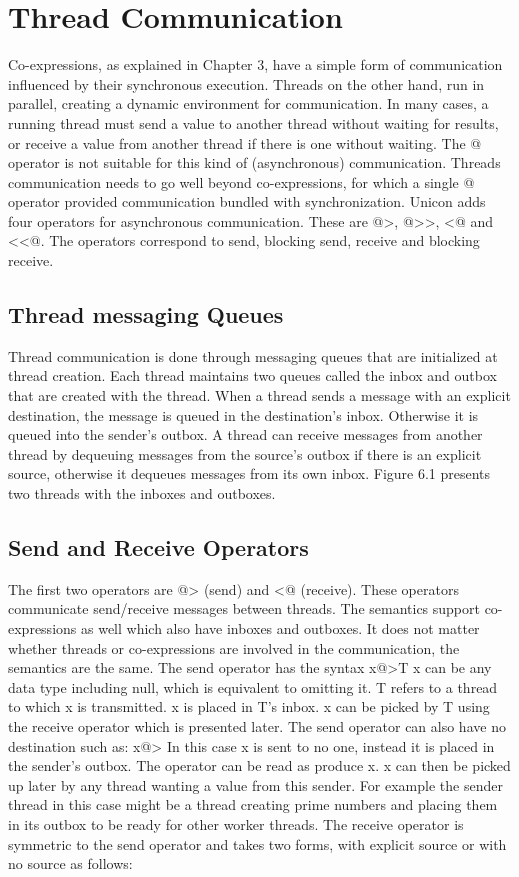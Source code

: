 \section{Thread Communication}
Co-expressions, as explained in Chapter 3, have a simple form of communication
influenced by their synchronous execution. Threads on the other hand, run in parallel,
creating a dynamic environment for communication. In many cases, a running thread
must send a value to another thread without waiting for results, or receive
a value from another thread if there is one without waiting. The @ operator is not
suitable for this kind of (asynchronous) communication. Threads communication needs
to go well beyond co-expressions, for which a single @ operator provided communication
bundled with synchronization. Unicon adds four operators for asynchronous
communication. These are @>, @>>, <@ and <<@. The operators correspond to send,
blocking send, receive and blocking receive.

\subsection{Thread messaging Queues}
Thread communication is done through messaging queues that are initialized at thread
creation. Each thread maintains two queues called the inbox and outbox that are created
with the thread. When a thread sends a message with an explicit destination, the message
is queued in the destination's inbox. Otherwise it is queued into the sender's outbox.
A thread can receive messages from another thread by dequeuing messages from the source's
outbox if there is an explicit source, otherwise it dequeues messages from its own inbox.
Figure 6.1 presents two threads with the inboxes and outboxes. 


\subsection{Send and Receive Operators}
The first two operators are @> (send) and <@ (receive). These operators communicate
send/receive messages between threads. The semantics support co-expressions as well
which also have inboxes and outboxes. It does not matter whether threads or co-expressions
are involved in the communication, the semantics are the same. The send operator has the syntax 
x@>T
x can be any data type including null, which is equivalent to omitting it. T refers to a thread
to which x is transmitted. x is placed in T's inbox. x can be picked by T using the receive
operator which is presented later. The send operator can also have no destination such as:
x@>
In this case x is sent to no one, instead it is placed in the sender's outbox.
The operator can be read as produce x. x can then be picked up later by any
thread wanting a value from this sender. For example the sender thread in this case
might be a thread creating prime numbers and placing them in its outbox to be ready
for other worker threads.
The receive operator is symmetric to the send operator and takes two forms, with
explicit source or with no source as follows:

